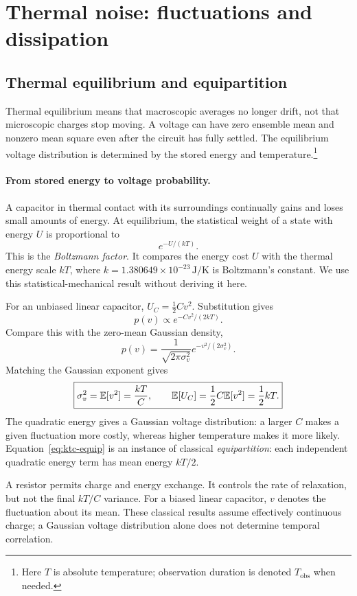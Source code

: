 \clearpage
\section{Thermal noise: fluctuations and dissipation}
\subsection{Thermal equilibrium and equipartition}
Thermal equilibrium means that macroscopic averages no longer drift, not that microscopic charges stop moving. A voltage can have zero ensemble mean and nonzero mean square even after the circuit has fully settled. The equilibrium voltage distribution is determined by the stored energy and temperature.\footnote{Here $T$ is absolute temperature; observation duration is denoted $T_{\mathrm{obs}}$ when needed.}

\paragraph{From stored energy to voltage probability.}
A capacitor in thermal contact with its surroundings continually gains and loses small amounts of energy. At equilibrium, the statistical weight of a state with energy $U$ is proportional to
\[
e^{-U/(kT)}.
\]
This is the \emph{Boltzmann factor}. It compares the energy cost $U$ with the thermal energy scale $kT$, where $k=1.380649\times10^{-23}\,\mathrm{J/K}$ is Boltzmann's constant. We use this statistical-mechanical result without deriving it here.

For an unbiased linear capacitor, $U_C=\tfrac12 Cv^2$. Substitution gives
\[
p(v)\propto e^{-Cv^2/(2kT)}.
\]
Compare this with the zero-mean Gaussian density,
\[
p(v)=\frac1{\sqrt{2\pi\sigma_v^2}}e^{-v^2/(2\sigma_v^2)}.
\]
Matching the Gaussian exponent gives
\begin{equation}
\boxed{\sigma_v^2=\mathbb E[v^2]=\frac{kT}{C},\qquad
\mathbb E[U_C]=\frac12 C\mathbb E[v^2]=\frac12 kT.}
\label{eq:ktc-equip}
\end{equation}
The quadratic energy gives a Gaussian voltage distribution: a larger $C$ makes a given fluctuation more costly, whereas higher temperature makes it more likely. Equation~\eqref{eq:ktc-equip} is an instance of classical \emph{equipartition}: each independent quadratic energy term has mean energy $kT/2$.

A resistor permits charge and energy exchange. It controls the rate of relaxation, but not the final $kT/C$ variance. For a biased linear capacitor, $v$ denotes the fluctuation about its mean. These classical results assume effectively continuous charge; a Gaussian voltage distribution alone does not determine temporal correlation.

